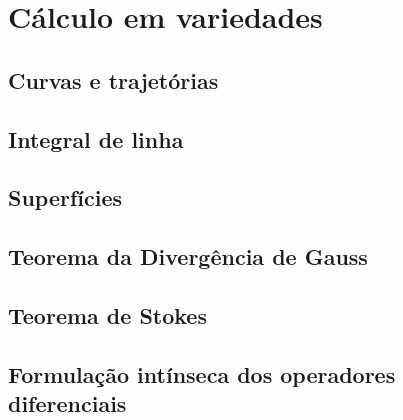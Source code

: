 \documentclass[12pt]{book}
\begin{document}
\part{Cálculo em variedades}

\chapter{Curvas e trajetórias}
\chapter{Integral de linha}
\chapter{Superfícies}
\chapter{Teorema da Divergência de Gauss}
\chapter{Teorema de Stokes}
\chapter{Formulação intínseca dos operadores diferenciais}
















\backmatter





\printindex
\end{document}
